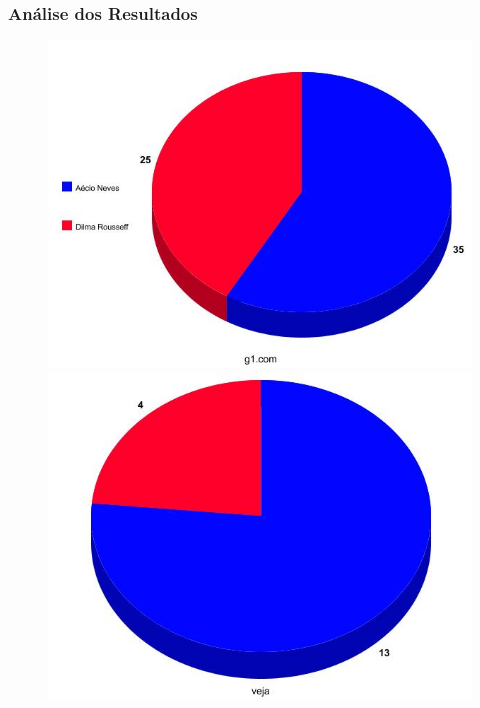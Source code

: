 
\begin{frame}[fragile]
\frametitle{Análise dos Resultados}
\begin{figure} 
\includegraphics[width=0.4\paperheight]{graph-g1.jpg}
\includegraphics[width=0.4\paperheight]{graph-veja.jpg}

\end{figure}
\end{frame}
